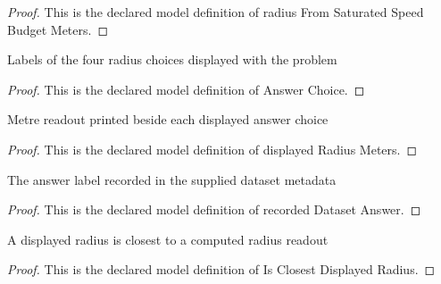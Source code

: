 \begin{proof}
  This is the declared model definition of radius From Saturated Speed Budget Meters.
\end{proof}
\begin{definition}
  \label{def:physics:phyx-mini-0818:phyxminiproblems-problemphyxmini0818-answerchoice}
  Labels of the four radius choices displayed with the problem
\end{definition}
\begin{proof}
  This is the declared model definition of Answer Choice.
\end{proof}
\begin{definition}
  \label{def:physics:phyx-mini-0818:phyxminiproblems-problemphyxmini0818-displayedradiusmeters}
  Metre readout printed beside each displayed answer choice
\end{definition}
\begin{proof}
  This is the declared model definition of displayed Radius Meters.
\end{proof}
\begin{definition}
  \label{def:physics:phyx-mini-0818:phyxminiproblems-problemphyxmini0818-recordeddatasetanswer}
  The answer label recorded in the supplied dataset metadata
\end{definition}
\begin{proof}
  This is the declared model definition of recorded Dataset Answer.
\end{proof}
\begin{definition}
  \label{def:physics:phyx-mini-0818:phyxminiproblems-problemphyxmini0818-isclosestdisplayedradius}
  A displayed radius is closest to a computed radius readout
\end{definition}
\begin{proof}
  This is the declared model definition of Is Closest Displayed Radius.
\end{proof}
